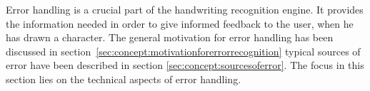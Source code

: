 

    

    
    

%    
%    


Error handling is a crucial part of the handwriting recognition engine.
It provides the information needed in order to give informed feedback to 
the user, when he has drawn a character. The general motivation for error 
handling has been discussed in 
section~\ref{sec:concept:motivationforerrorrecognition}
typical sources of error have been described in 
section \ref{sec:concept:sourcesoferror}. 
The focus in this section lies on the technical aspects of error handling.

